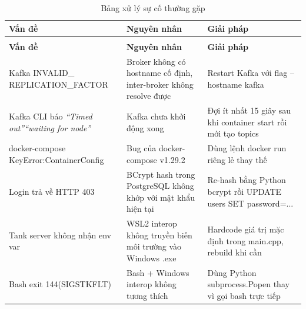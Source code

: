 \documentclass[12pt,a4paper]{report}
\renewcommand{\arraystretch}{1.3}
\begin{document}
\renewcommand{\arraystretch}{1.8}
\begin{longtable}{%
  >{\RaggedRight\arraybackslash\footnotesize}p{3.8cm}%
  >{\RaggedRight\arraybackslash\footnotesize}p{4.4cm}%
  >{\RaggedRight\arraybackslash\footnotesize}p{6.5cm}}
\caption{Bảng xử lý sự cố thường gặp} \label{tab:troubleshoot}\\
\toprule
\textbf{\small Vấn đề} & \textbf{\small Nguyên nhân} & \textbf{\small Giải pháp} \\
\midrule
\endfirsthead
\multicolumn{3}{l}{\footnotesize\textit{(tiếp theo Bảng~\ref{tab:troubleshoot})}}\\
\toprule
\textbf{\small Vấn đề} & \textbf{\small Nguyên nhân} & \textbf{\small Giải pháp} \\
\midrule
\endhead
\bottomrule
\endfoot

Kafka\newline
{\footnotesize\ttfamily INVALID\_}\newline
{\footnotesize\ttfamily REPLICATION\_FACTOR} &
  Broker không có hostname cố định, inter-broker không resolve được &
  Restart Kafka với flag {\ttfamily --hostname kafka} \\

Kafka CLI báo\newline
\textit{``Timed out''\newline``waiting for node''} &
  Kafka chưa khởi động xong &
  Đợi ít nhất 15 giây sau khi container start rồi mới tạo topics \\

{\ttfamily docker-compose}\newline
{\ttfamily KeyError:\newline ContainerConfig} &
  Bug của docker-compose v1.29.2 &
  Dùng lệnh {\ttfamily docker run} riêng lẻ thay thế \\

Login trả về HTTP 403 &
  BCrypt hash trong PostgreSQL không khớp với mật khẩu hiện tại &
  Re-hash bằng Python bcrypt rồi {\ttfamily UPDATE users SET password=...} \\

Tank server không nhận env var &
  WSL2 interop không truyền biến môi trường vào Windows .exe &
  Hardcode giá trị mặc định trong {\ttfamily main.cpp}, rebuild khi cần \\

Bash exit 144\newline(SIGSTKFLT) &
  Bash + Windows interop không tương thích &
  Dùng Python {\ttfamily subprocess.Popen} thay vì gọi bash trực tiếp \\


\end{longtable}
\end{document}

